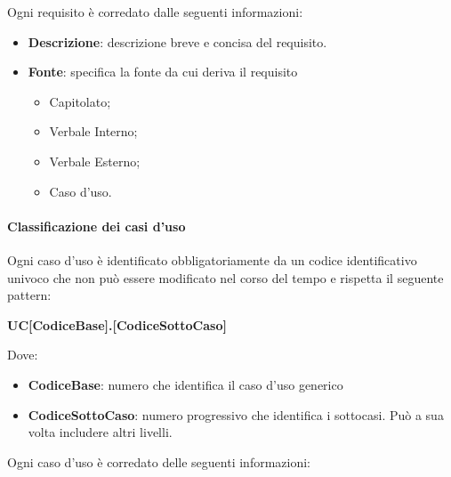 Ogni requisito è corredato dalle seguenti informazioni:
\begin{itemize}
  \item \textbf{Descrizione}: descrizione breve e concisa del requisito.
  \item \textbf{Fonte}: specifica la fonte da cui deriva il requisito
        \begin{itemize}
          \item Capitolato;
          \item Verbale Interno;
          \item Verbale Esterno;
          \item Caso d'uso.
        \end{itemize}
\end{itemize}

\paragraph{Classificazione dei casi d'uso}
Ogni caso d'uso è identificato obbligatoriamente da un codice identificativo univoco che non può essere modificato nel corso del tempo e rispetta il seguente pattern:
	\begin{center}
	\textbf{UC[CodiceBase].[CodiceSottoCaso]}
	\end{center}

Dove:

\begin{itemize}
  \item \textbf{CodiceBase}: numero che identifica il caso d'uso generico
  \item \textbf{CodiceSottoCaso}: numero progressivo che identifica i sottocasi.  Può a sua volta includere altri livelli.
\end{itemize}

Ogni caso d'uso è corredato delle seguenti informazioni:

